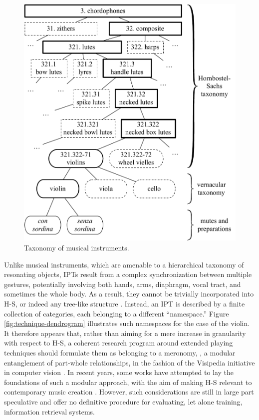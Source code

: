 \begin{figure}[t!]
\centering
\includegraphics[width=\linewidth]{instrument-dendrogram.pdf}
\caption{Taxonomy of musical instruments.}
\label{fig:instrument-dendrogram}
\end{figure}

Unlike musical instruments, which are amenable to a hierarchical taxonomy of resonating objects, IPTs result from a complex synchronization between multiple gestures, potentially involving both hands, arms, diaphragm, vocal tract, and sometimes the whole body.
As a result, they cannot be trivially incorporated into H-S, or indeed any tree-like structure \cite{kolozali2011ismir}.
Instead, an IPT is described by a finite collection of categories, each belonging to a different ``name\-space.''
Figure \ref{fig:technique-dendrogram} illustrates such namespaces for the case of the violin.
It therefore appears that, rather than aiming for a mere increase in granularity with respect to H-S, a coherent research program around extended playing techniques should formulate them as belonging to a meronomy, \ie{}, a modular entanglement of part-whole relationships, in the fashion of the Visipedia initiative in computer vision \cite{belongie2015pattern}.
In recent years, some works have attempted to lay the foundations of such a modular approach, with the aim of making H-S relevant to contemporary music creation \cite{magnusson2017jnmr,weisser2011ytm}.
However, such considerations are still in large part speculative and offer no definitive procedure for evaluating, let alone training, information retrieval systems.

